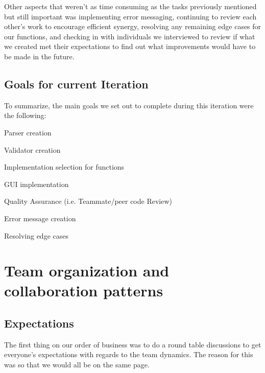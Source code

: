 \documentclass[a4paper, 12pt]{article}
\begin{document}
Other aspects that weren’t as time consuming as the tasks previously mentioned but still important was implementing error messaging, continuing to review each other's work to encourage efficient synergy, resolving any remaining edge cases for our functions, and checking in with individuals we interviewed to review if what we created met their expectations to find out what improvements would have to be made in the future. 




\subsection{Goals for current Iteration}

To summarize, the main goals we set out to complete during this iteration were the following:
\\

\begin{compactitem}
\item Parser creation
\item Validator creation
\item Implementation selection for functions
\item GUI implementation
\item Quality Assurance (i.e. Teammate/peer code Review)
\item Error message creation
\item Resolving edge cases
\end{compactitem}

\section{Team organization and collaboration patterns}

\subsection{Expectations}

The first thing on our order of business was to do a round table discussions to get everyone's expectations with regards to the team dynamics. The reason for this was so that we would all be on the same page.

\medskip
\end{document}

